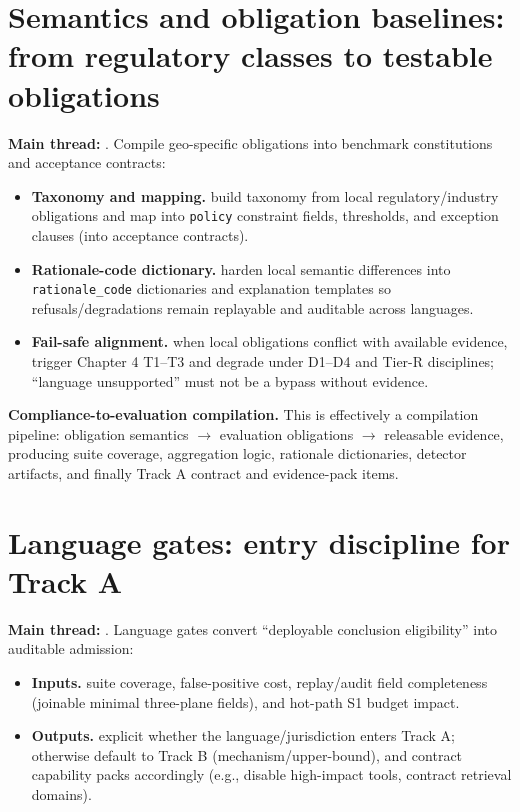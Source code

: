 \documentclass[11pt,a4paper]{report}
\begin{document}
\section{Semantics and obligation baselines: from regulatory classes to testable obligations}
\textbf{Main thread:} \EvalFramework{}. Compile geo-specific obligations into benchmark constitutions and acceptance contracts:
\begin{itemize}
  \item \textbf{Taxonomy and mapping.} build taxonomy from local regulatory/industry obligations and map into \texttt{policy} constraint fields, thresholds, and exception clauses (into acceptance contracts).
  \item \textbf{Rationale-code dictionary.} harden local semantic differences into \texttt{rationale\_code} dictionaries and explanation templates so refusals/degradations remain replayable and auditable across languages.
  \item \textbf{Fail-safe alignment.} when local obligations conflict with available evidence, trigger Chapter 4 T1--T3 and degrade under D1--D4 and Tier-R disciplines; “language unsupported” must not be a bypass without evidence.
\end{itemize}

\noindent\textbf{Compliance-to-evaluation compilation.} This is effectively a compilation pipeline: obligation semantics $\rightarrow$ evaluation obligations $\rightarrow$ releasable evidence, producing suite coverage, aggregation logic, rationale dictionaries, detector artifacts, and finally Track A contract and evidence-pack items.

\section{Language gates: entry discipline for Track A}
\textbf{Main thread:} \EvalFramework{}. Language gates convert “deployable conclusion eligibility” into auditable admission:
\begin{itemize}
  \item \textbf{Inputs.} suite coverage, false-positive cost, replay/audit field completeness (joinable minimal three-plane fields), and hot-path S1 budget impact.
  \item \textbf{Outputs.} explicit whether the language/jurisdiction enters Track A; otherwise default to Track B (mechanism/upper-bound), and contract capability packs accordingly (e.g., disable high-impact tools, contract retrieval domains).
\end{itemize}
\end{document}
